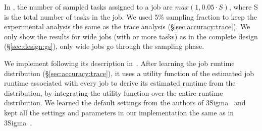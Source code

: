 {{In \lTechnique, the number of sampled tasks assigned to a job are
$max(1, 0.05 \cdot S)$, where S is the total number of tasks in the
job. We used 5\% sampling fraction to keep the experimental analysis
the same as the trace analysis
(\S\ref{sec:accuracy:trace}). {We only show the results for wide
  jobs (with \thinLimit or more tasks) as in the complete \slearn design (\S\ref{sec:design:gs}), only
  wide jobs go through the sampling phase.
  }


We implement \primarybasepredict following its description in~\cite{3Sigma}.
After learning the job runtime distribution (\S\ref{sec:accuracy:trace}),
it uses a utility function of the estimated job runtime
associated with every job to derive its estimated runtime from the
distribution, by integrating the utility function
over the entire runtime distribution.
We learned the default settings
from the authors of 3Sigma~\cite{3Sigma} and kept all the settings
and parameters in our implementation the same 
as in 3Sigma~\cite{3Sigma}.

}}
